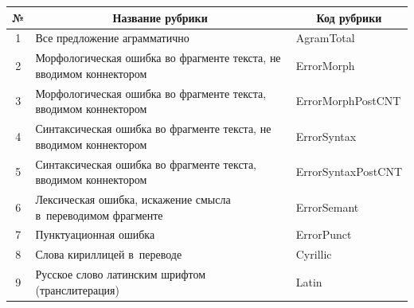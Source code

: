   \begin{table}\small %


  \begin{center}




  \vspace*{2ex}


  


  \begin{tabular}{|c|p{80mm}|l|}


  \hline


№ &\multicolumn{1}{c|}{Название рубрики}&\multicolumn{1}{c|}{Код рубрики}\\


\hline


1&Все предложение аграмматично&AgramTotal\\


\hline


2&Морфологическая ошибка во фрагменте текста, не вводимом коннектором&ErrorMorph\\


\hline


3&Морфологическая ошибка во фрагменте текста, вводимом коннектором&ErrorMorphPostCNT\\


\hline


4&Синтаксическая ошибка во фрагменте текста, не вводимом коннектором&ErrorSyntax\\


\hline


5&Синтаксическая ошибка во фрагменте текста, вводимом коннектором&ErrorSyntaxPostCNT\\


\hline


6&Лексическая ошибка, искажение смысла в~переводимом фрагменте&ErrorSemant\\


\hline


7&Пунктуационная ошибка&ErrorPunct\\


\hline


8&Слова кириллицей в~переводе&Cyrillic\\


\hline


9&Русское слово латинским шрифтом (транслитерация)&Latin\\


\hline



\end{tabular}
\end{center}
\end{table}

